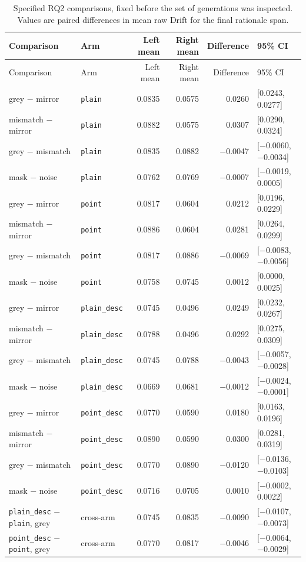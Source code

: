 \begin{longtable}{L{3.9cm}lrrrL{3.0cm}}
\caption[Planned RQ2 comparisons]{Specified RQ2 comparisons, fixed before the
set of generations was inspected. Values are paired differences in
mean raw Drift for the final rationale span.}\label{tab:app-rq2-contrasts}\\
\toprule
Comparison & Arm & Left mean & Right mean & Difference & 95\% CI \\
\midrule
\endfirsthead
\toprule
Comparison & Arm & Left mean & Right mean & Difference & 95\% CI \\
\midrule
\endhead
grey $-$ mirror & \texttt{plain} & 0.0835 & 0.0575 & 0.0260 & [0.0243, 0.0277] \\
mismatch $-$ mirror & \texttt{plain} & 0.0882 & 0.0575 & 0.0307 & [0.0290, 0.0324] \\
grey $-$ mismatch & \texttt{plain} & 0.0835 & 0.0882 & $-$0.0047 & [$-$0.0060, $-$0.0034] \\
mask $-$ noise & \texttt{plain} & 0.0762 & 0.0769 & $-$0.0007 & [$-$0.0019, 0.0005] \\
grey $-$ mirror & \texttt{point} & 0.0817 & 0.0604 & 0.0212 & [0.0196, 0.0229] \\
mismatch $-$ mirror & \texttt{point} & 0.0886 & 0.0604 & 0.0281 & [0.0264, 0.0299] \\
grey $-$ mismatch & \texttt{point} & 0.0817 & 0.0886 & $-$0.0069 & [$-$0.0083, $-$0.0056] \\
mask $-$ noise & \texttt{point} & 0.0758 & 0.0745 & 0.0012 & [0.0000, 0.0025] \\
grey $-$ mirror & \texttt{plain\_desc} & 0.0745 & 0.0496 & 0.0249 & [0.0232, 0.0267] \\
mismatch $-$ mirror & \texttt{plain\_desc} & 0.0788 & 0.0496 & 0.0292 & [0.0275, 0.0309] \\
grey $-$ mismatch & \texttt{plain\_desc} & 0.0745 & 0.0788 & $-$0.0043 & [$-$0.0057, $-$0.0028] \\
mask $-$ noise & \texttt{plain\_desc} & 0.0669 & 0.0681 & $-$0.0012 & [$-$0.0024, $-$0.0001] \\
grey $-$ mirror & \texttt{point\_desc} & 0.0770 & 0.0590 & 0.0180 & [0.0163, 0.0196] \\
mismatch $-$ mirror & \texttt{point\_desc} & 0.0890 & 0.0590 & 0.0300 & [0.0281, 0.0319] \\
grey $-$ mismatch & \texttt{point\_desc} & 0.0770 & 0.0890 & $-$0.0120 & [$-$0.0136, $-$0.0103] \\
mask $-$ noise & \texttt{point\_desc} & 0.0716 & 0.0705 & 0.0010 & [$-$0.0002, 0.0022] \\
\texttt{plain\_desc} $-$ \texttt{plain}, grey & cross-arm & 0.0745 & 0.0835 & $-$0.0090 & [$-$0.0107, $-$0.0073] \\
\texttt{point\_desc} $-$ \texttt{point}, grey & cross-arm & 0.0770 & 0.0817 & $-$0.0046 & [$-$0.0064, $-$0.0029] \\
\bottomrule
\end{longtable}

